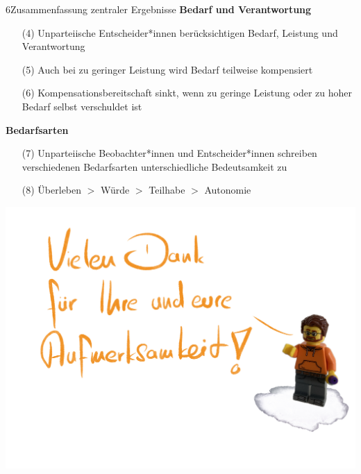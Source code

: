\documentclass[xcolor=table,9pt,aspectratio=169]{beamer}
\begin{document}
\begin{frame}{\vspace*{10mm}6\hspace*{1em}Zusammenfassung zentraler Ergebnisse}
\textbf{Bedarf und Verantwortung}\\
\medskip
\begin{itemize}
   \item[(4)] Unparteiische Entscheider*innen berücksichtigen Bedarf, Leistung und Verantwortung
   \item[(5)] Auch bei zu geringer Leistung wird Bedarf teilweise kompensiert
   \item[(6)] Kompensationsbereitschaft sinkt, wenn zu geringe Leistung oder zu hoher Bedarf selbst verschuldet ist
\end{itemize}
\vspace{2em}
\textbf{Bedarfsarten}\\
\medskip
\begin{itemize}
   \item[(7)] Unparteiische Beobachter*innen und Entscheider*innen schreiben verschiedenen Bedarfsarten unterschiedliche Bedeutsamkeit zu
   \item[(8)] Überleben $>$ Würde $>$ Teilhabe $>$ Autonomie
   \end{itemize}
\end{frame}


\begin{frame}{}
\begin{center}
   \includegraphics[width=0.8\linewidth]{figures/slides_thanks.pdf}
\end{center}
\end{frame}
\end{document}

